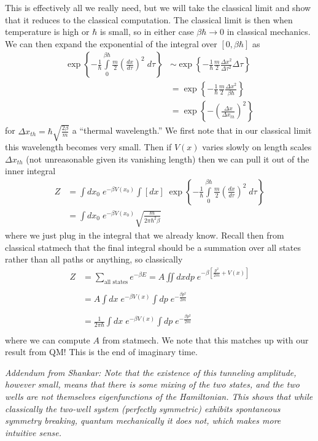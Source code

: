 \documentclass[10pt]{report}
\newcommand{\rd}[2]{\frac{d#1}{d#2}}
\begin{document}
This is effectively all we really need, but we will take the classical limit and show that it reduces to the classical computation. The classical limit is then when temperature is high or $\hbar$ is small, so in either case $\beta\hbar \to 0$ in classical mechanics. We can then expand the exponential of the integral over $[0, \beta\hbar]$ as
\begin{align}
    \exp\left\{ -\frac{1}{\hbar}\int\limits_{0}^{\beta\hbar}\frac{m}{2}\left( \rd{x}{\tau} \right)^2\;d\tau \right\} &\sim \exp\left\{ -\frac{1}{\hbar}\frac{m}{2}\frac{\Delta x^2}{\Delta \tau^2}\Delta \tau \right\}\\
    &= \exp\left\{ -\frac{1}{\hbar}\frac{m}{2}\frac{\Delta x^2}{\beta\hbar} \right\}\\
    &= \exp\left\{ -\left( \frac{\Delta x}{\Delta x_{th}} \right)^2 \right\}
\end{align}
for $\Delta x_{th} = \hbar \sqrt{\frac{2\beta}{m}}$ a ``thermal wavelength.'' We first note that in our classical limit this wavelength becomes very small. Then if $V(x)$ varies slowly on length scales $\Delta x_{th}$ (not unreasonable given its vanishing length) then we can pull it out of the inner integral
\begin{align}
    Z &= \int\limits_{}^{}dx_0\;e^{-\beta V(x_0)}\int\limits_{}^{}[dx]\;\exp\left\{ -\frac{1}{\hbar}\int\limits_{0}^{\beta\hbar}\frac{m}{2}\left( \rd{x}{\tau} \right)^2\;d\tau \right\}\\
    &= \int\limits_{}^{}dx_0\;e^{-\beta V(x_0)}\sqrt{\frac{m}{2\pi \hbar^2 \beta}}
\end{align}
where we just plug in the integral that we already know. Recall then from classical statmech that the final integral should be a summation over all states rather than all paths or anything, so classically
\begin{align}
    Z &= \sum_{\text{all states}}^{}e^{-\beta E} = A\iint\limits_{}^{}dx dp\;e^{-\beta\left[ \frac{p^2}{2m} + V(x) \right]}\\
    &= A\int\limits_{}^{}dx\;e^{-\beta V(x)}\int\limits_{}^{}dp\;e^{-\frac{\beta p^2}{2m}}\\
    &= \frac{1}{2\pi\hbar}\int\limits_{}^{}dx\;e^{-\beta V(x)}\int\limits_{}^{}dp\;e^{-\frac{\beta p^2}{2m}}
\end{align}
where we can compute $A$ from statmech. We note that this matches up with our result from QM! This is the end of imaginary time.

\emph{Addendum from Shankar: Note that the existence of this tunneling amplitude, however small, means that there is some mixing of the two states, and the two wells are not themselves eigenfunctions of the Hamiltonian. This shows that while classically the two-well system (perfectly symmetric) exhibits spontaneous symmetry breaking, quantum mechanically it does not, which makes more intuitive sense.}
\end{document}
